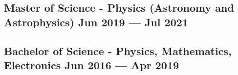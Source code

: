 
\subsection*{Master of Science - Physics (Astronomy and Astrophysics) \hfill Jun 2019 --- Jul 2021} 
\vspace{0.1cm}
\subsection*{Bachelor of Science - Physics, Mathematics, Electronics \hfill Jun 2016 --- Apr 2019}
